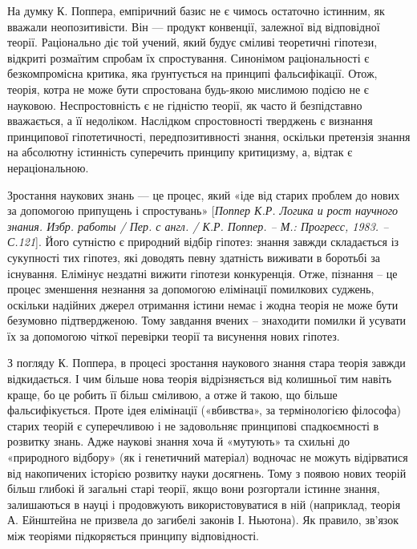 На думку К. Поппера, емпіричний базис не є чимось остаточно істинним, як
вважали неопозитивісти. Він --- продукт конвенції, залежної від відповідної
теорії. Раціонально діє той учений, який будує сміливі теоретичні гіпотези,
відкриті розмаїтим спробам їх спростування. Синонімом раціональності є
безкомпромісна критика, яка ґрунтується на принципі фальсифікації. Отож,
теорія, котра не може бути спростована будь-якою мислимою подією не є
науковою. Неспростовність є не гідністю теорії, як часто й безпідставно
вважається, а її недоліком. Наслідком спростовності тверджень є визнання
принципової гіпотетичності, передпозитивності знання, оскільки претензія
знання на абсолютну істинність суперечить принципу критицизму, а, відтак є
нераціональною.

Зростання наукових знань --- це процес, який «іде від старих проблем до
нових за допомогою припущень і спростувань» [\textit{Поппер К.Р. Логика и рост
научного знания. Избр. работы / Пер. с англ. / К.Р. Поппер. – М.: Прогресс,
1983. – С.121}]. Його сутністю є природний відбір гіпотез: знання завжди
складається із сукупності тих гіпотез, які доводять певну здатність виживати в
боротьбі за існування. Елімінує нездатні вижити гіпотези конкуренція. Отже,
пізнання – це процес зменшення незнання за допомогою елімінації помилкових
суджень, оскільки надійних джерел отримання істини немає і жодна теорія не
може бути безумовно підтвердженою. Тому завдання вчених – знаходити
помилки й усувати їх за допомогою чіткої перевірки теорії та висунення нових
гіпотез.

З погляду К. Поппера, в процесі зростання наукового знання стара теорія
завжди відкидається. І чим більше нова теорія відрізняється від колишньої тим
навіть краще, бо це робить її більш сміливою, а отже й такою, що більше
фальсифікується. Проте ідея елімінації («вбивства», за термінологією філософа)
старих теорій є суперечливою і не задовольняє принципові спадкоємності в
розвитку знань. Адже наукові знання хоча й «мутують» та схильні до
«природного відбору» (як і генетичний матеріал) водночас не можуть
відірватися від накопичених історією розвитку науки досягнень. Тому з появою
нових теорій більш глибокі й загальні старі теорії, якщо вони розгортали
істинне знання, залишаються в науці і продовжують використовуватися в ній
(наприклад, теорія А. Ейнштейна не призвела до загибелі законів І. Ньютона).
Як правило, зв’язок між теоріями підкоряється принципу відповідності.

